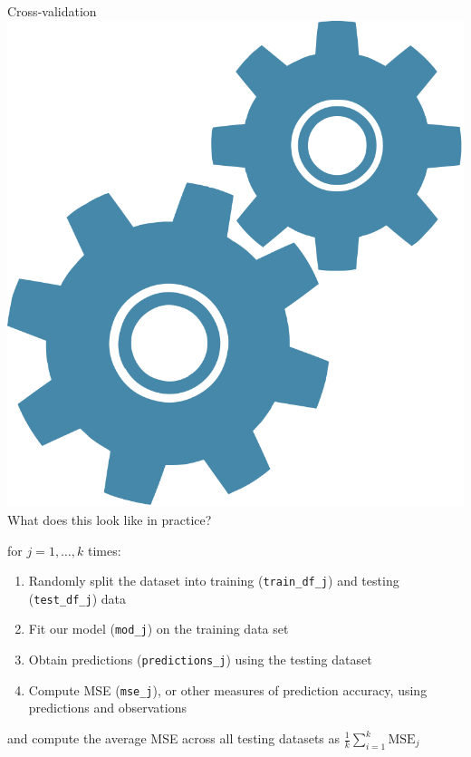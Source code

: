 \documentclass[10pt,t]{beamer}
\begin{document}
\begin{frame}{Cross-validation \includegraphics[scale=0.01]{figures/technical.png} }
	What does this look like in practice?
	
	\vspace{0.3cm}
	
	for $j = 1, \dots, k$ times:
	
	\vspace{0.3cm}
	
	\begin{enumerate}
		\item Randomly split the dataset into training (\texttt{train\_df\_j}) and testing (\texttt{test\_df\_j}) data
		\item Fit our model (\texttt{mod\_j}) on the training data set
		\item Obtain predictions (\texttt{predictions\_j}) using the testing dataset 
		\item Compute MSE (\texttt{mse\_j}), or other measures of prediction accuracy, using predictions and observations 
	\end{enumerate}
	
	\vspace{0.3cm}
	
	and compute the average MSE across all testing datasets as $\frac{1}{k} \sum_{i = 1}^k \text{MSE}_j$ 
	
\end{frame}
\end{document}
